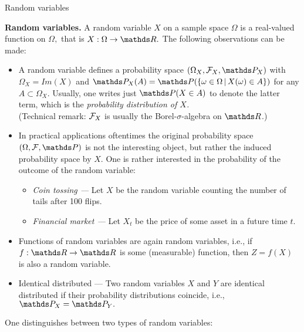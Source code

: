 \begin{vbframe}{Random variables}  
 
 \textbf{Random variables.} A random variable $X$ on a sample space $\Omega$ is a real-valued function on $\Omega,$ that is $X:\Omega \to \R.$ The following observations can be made:
 \begin{itemize}
 	\item 	A random variable defines a probability space $(\Omega_X,\F_X,\P_X)$ with $\Omega_X= Im(X)$ and $\P_X(A)=\P(\{\omega\in\Omega \, | \, X(\omega) \in A \})$ for any $A\subset \Omega_X.$ Usually, one writes just $\P(X\in A)$ to denote the latter term, which is the \emph{probability distribution of $X$.}\\
 	
 	{\tiny (Technical remark: $\mathcal{F}_X$ is usually the Borel-$\sigma$-algebra on $\R$.)}
 	\item In practical applications oftentimes the original probability space $(\Omega,\F,\P)$ is not the interesting object, but rather the induced probability space by $X.$ 
 	One is rather interested in the probability of the outcome of the random variable:
 	\begin{itemize}
 		\item \emph{Coin tossing ---} Let $X$ be the random variable counting the number of tails after 100 flips.
 		\item \emph{Financial market ---} Let $X_t$ be the  price of some asset in a future time $t.$
 	\end{itemize}
 	\framebreak
 	\item Functions of random variables are again random variables, i.e., if $f:\R \to \R$ is some (measurable) function, then $Z=f(X)$ is also a random variable.\\
 	\item Identical distributed --- Two random variables $X$ and $Y$ are identical distributed if their probability distributions coincide, i.e., $\P_X = \P_Y.$ 
 \end{itemize}
 One distinguishes between two types of random variables:
 \begin{itemize}
 	

\end{itemize}
\end{vbframe}
